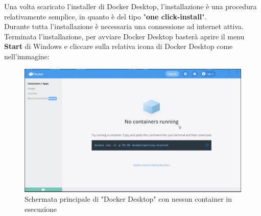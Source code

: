 Una volta scaricato l'\gls{installer} di Docker Desktop, l'installazione è una procedura relativamente semplice, in quanto è del tipo "\textbf{one click-install}".\\
Durante tutta l'installazione è necessaria una connessione ad internet attiva.\\
Terminata l'installazione, per avviare Docker Desktop basterà aprire il menu \textbf{Start} di Windows e cliccare sulla relativa icona di Docker Desktop come nell'immagine:\\
\begin{figure}[!h]     
\centering 
    \includegraphics[width=1.0\columnwidth]{immagini/screenshot/docker_desktop_initialscreen} 
    \caption{Schermata principale di "Docker Desktop" con nessun container in esecuzione}
\end{figure} \\



